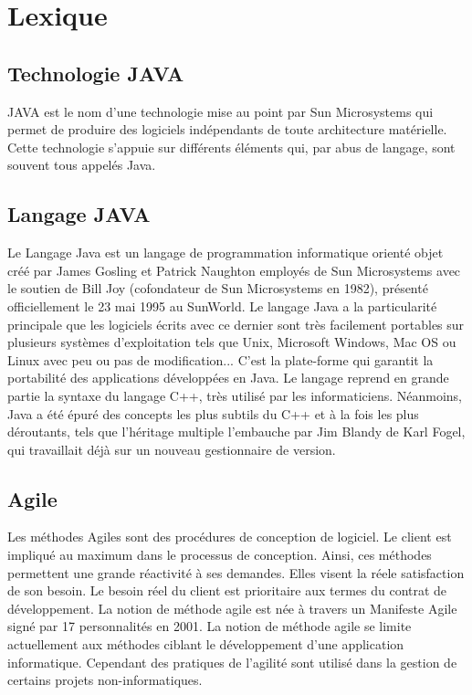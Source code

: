 \chapter{Lexique}

\section{Technologie JAVA}\label{lexique:JAVA_tech}
JAVA est le nom d'une technologie mise au point par Sun Microsystems qui permet de produire des logiciels indépendants de toute architecture matérielle. Cette technologie s'appuie sur différents éléments qui, par abus de langage, sont souvent tous appelés Java.

\section{Langage JAVA}\label{lexique:JAVA_lg}
Le Langage Java est un langage de programmation informatique orienté objet créé par James Gosling et Patrick Naughton employés de Sun Microsystems avec le soutien de Bill Joy (cofondateur de Sun Microsystems en 1982), présenté officiellement le 23 mai 1995 au SunWorld. Le langage Java a la particularité principale que les logiciels écrits avec ce dernier sont très facilement portables sur plusieurs systèmes d'exploitation tels que Unix, Microsoft Windows, Mac OS ou Linux avec peu ou pas de modification... C'est la plate-forme qui garantit la portabilité des applications développées en Java. Le langage reprend en grande partie la syntaxe du langage C++, très utilisé par les informaticiens. Néanmoins, Java a été épuré des concepts les plus subtils du C++ et à la fois les plus déroutants, tels que l'héritage multiple 	 l'embauche par Jim Blandy de Karl Fogel, qui travaillait déjà sur un nouveau gestionnaire de version. 

\section{Agile}\label{lexique:agile}
Les méthodes Agiles sont des procédures de conception de logiciel. Le client est impliqué au maximum dans le processus de conception. Ainsi, ces méthodes permettent une grande réactivité à ses demandes. Elles visent la réele satisfaction de son besoin. Le besoin réel du client est prioritaire aux termes du contrat de développement. La notion de méthode agile est née à travers un Manifeste Agile signé par 17 personnalités en 2001. La notion de méthode agile se limite actuellement aux méthodes ciblant le développement d'une application informatique. Cependant des pratiques de l'agilité sont utilisé dans la gestion de certains projets non-informatiques.

